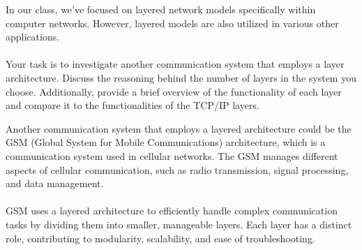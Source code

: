 \documentclass[a4paper]{exam}
\begin{document}
\begin{questions}
        \question[20]
        In our class, we've focused on layered network models specifically within computer networks. However, layered models are also utilized in various other applications. \\ \\Your task is to investigate another communication system that employs a layer architecture. Discuss the reasoning behind the number of layers in the system you choose. Additionally, provide a brief overview of the functionality of each layer and compare it to the functionalities of the TCP/IP layers.
        \begin{solution}
            Another communication system that employs a layered architecture could be the GSM (Global System for Mobile Communications) architecture, which is a communication system used in cellular networks. The GSM manages different aspects of cellular communication, such as radio transmission, signal processing, and data management. \\
            \\
            GSM uses a layered architecture to efficiently handle complex communication tasks by dividing them into smaller, manageable layers. Each layer has a distinct role, contributing to modularity, scalability, and ease of troubleshooting.

\end{solution}
\end{questions}
\end{document}
